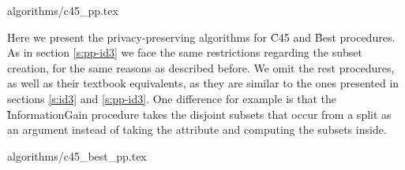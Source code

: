 {algorithms/c45_pp.tex}





Here we present the privacy\hyp preserving algorithms for \f{C45} and \f{Best} procedures.
As in section \ref{s:pp-id3} we face the same restrictions regarding the subset creation, for the same reasons as described before.
We omit the rest procedures, as well as their textbook equivalents, as they are similar to the ones presented in sections \ref{s:id3} and \ref{s:pp-id3}.
One difference for example is that the \f{InformationGain} procedure takes the disjoint subsets that occur from a split as an argument instead of taking the attribute and computing the subsets inside.


{algorithms/c45_best_pp.tex}
